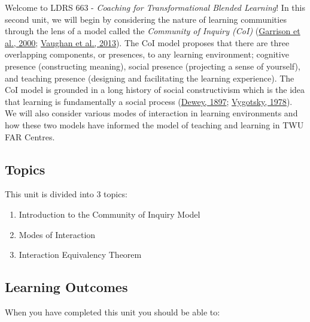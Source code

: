 \documentclass[
]{book}
\providecommand{\tightlist}{%
  \setlength{\itemsep}{0pt}\setlength{\parskip}{0pt}}
\begin{document}
Welcome to LDRS 663 - \emph{Coaching for Transformational Blended Learning}! In this second unit, we will begin by considering the nature of learning communities through the lens of a model called the \emph{Community of Inquiry (CoI)} (\href{https://www.sciencedirect.com/science/article/pii/S1096751600000166?}{Garrison et al., 2000}; \href{http://www.aupress.ca/index.php/books/120229}{Vaughan et al., 2013}). The CoI model proposes that there are three overlapping components, or presences, to any learning environment; cognitive presence (constructing meaning), social presence (projecting a sense of yourself), and teaching presence (designing and facilitating the learning experience). The CoI model is grounded in a long history of social constructivism which is the idea that learning is fundamentally a social process (\href{https://en.wikisource.org/wiki/My_Pedagogic_Creed}{Dewey, 1897}; \href{https://twu.idm.oclc.org/login?url=http://search.ebscohost.com/login.aspx?direct=true\&db=cat05965a\&AN=alc.191437\&site=eds-live}{Vygotsky, 1978}). We will also consider various modes of interaction in learning environments and how these two models have informed the model of teaching and learning in TWU FAR Centres.

\hypertarget{topics}{%
\subsection*{Topics}\label{topics}}

This unit is divided into 3 topics:

\begin{enumerate}
\def\labelenumi{\arabic{enumi}.}
\tightlist
\item
  Introduction to the Community of Inquiry Model\\
\item
  Modes of Interaction\\
\item
  Interaction Equivalency Theorem
\end{enumerate}

\hypertarget{learning-outcomes}{%
\subsection*{Learning Outcomes}\label{learning-outcomes}}

When you have completed this unit you should be able to:
\end{document}
